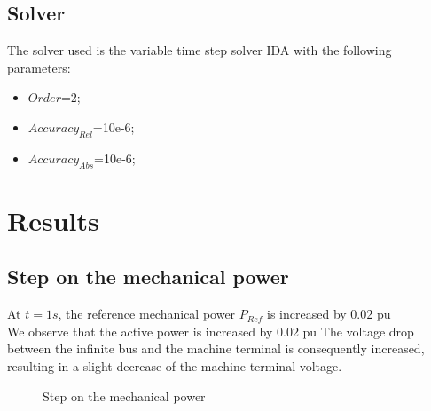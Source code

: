 \documentclass[a4paper, 12pt]{report}
\begin{document}
\subsection{Solver}
The solver used is the variable time step solver IDA with the following parameters:
\begin{itemize}
\item $Order$=2;
\item $Accuracy_{Rel}$=10e-6;
\item $Accuracy_{Abs}$=10e-6;
\end{itemize}

\newpage
\section{Results}

\subsection{Step on the mechanical power}

At $t=1s$, the reference mechanical power $P_{Ref}$ is increased by 0.02 pu\\

We observe that the active power is increased by 0.02 pu The voltage drop between the infinite bus and the machine terminal is consequently increased, resulting in a slight decrease of the machine terminal voltage.\\

\begin{figure}[H]
\caption{Step on the mechanical power}
\end{figure}
\end{document}
